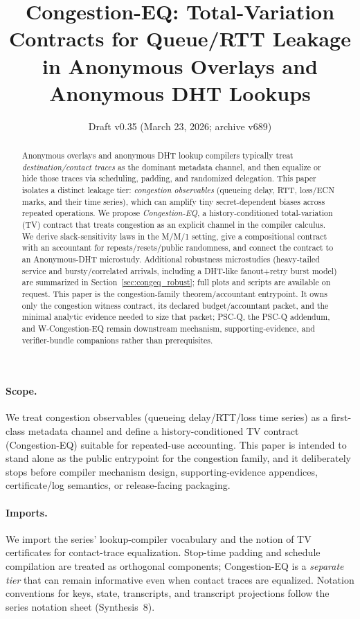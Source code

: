 \documentclass[11pt]{article}
\title{Congestion-EQ: Total-Variation Contracts for Queue/RTT Leakage \\ in Anonymous Overlays and Anonymous DHT Lookups}
\author{}
\date{Draft v0.35 (March 23, 2026; archive v689)}
\theoremstyle{definition}
\theoremstyle{remark}
\begin{document}
\maketitle

\begin{abstract}
Anonymous overlays and anonymous DHT lookup compilers typically treat \emph{destination/contact traces} as the dominant metadata channel, and then equalize or hide those traces via scheduling, padding, and randomized delegation.
This paper isolates a distinct leakage tier: \emph{congestion observables} (queueing delay, RTT, loss/ECN marks, and their time series), which can amplify tiny secret-dependent biases across repeated operations.
We propose \emph{Congestion-EQ}, a history-conditioned total-variation (TV) contract that treats congestion as an explicit channel in the compiler calculus.
We derive slack-sensitivity laws in the M/M/1 setting, give a compositional contract with an accountant for repeats/resets/public randomness, and connect the contract to an Anonymous-DHT microstudy.
Additional robustness microstudies (heavy-tailed service and bursty/correlated arrivals, including a DHT-like fanout+retry burst model) are summarized in Section~\ref{sec:congeq_robust}; full plots and scripts are available on request.
This paper is the congestion-family theorem/accountant entrypoint. It owns only the congestion witness contract, its declared budget/accountant packet, and the minimal analytic evidence needed to size that packet; PSC-Q, the PSC-Q addendum, and W-Congestion-EQ remain downstream mechanism, supporting-evidence, and verifier-bundle companions rather than prerequisites.\cite{series:pscq,series:pscqaddendum,series:wcongeq}
\end{abstract}
\paragraph{Scope.}
We treat congestion observables (queueing delay/RTT/loss time series) as a first-class metadata channel and define a history-conditioned TV contract (Congestion-EQ) suitable for repeated-use accounting. This paper is intended to stand alone as the public entrypoint for the congestion family, and it deliberately stops before compiler mechanism design, supporting-evidence appendices, certificate/log semantics, or release-facing packaging.\cite{series:pscq,series:pscqaddendum,series:wcongeq}

\paragraph{Imports.}
We import the series' lookup-compiler vocabulary and the notion of TV certificates for contact-trace equalization.\cite{series:schedcompiler,series:knapsacktransport}
Stop-time padding and schedule compilation are treated as orthogonal components; Congestion-EQ is a \emph{separate tier} that can remain informative even when contact traces are equalized.
Notation conventions for keys, state, transcripts, and transcript projections follow the series notation sheet (Synthesis~8).\cite{series:notation}
\end{document}
